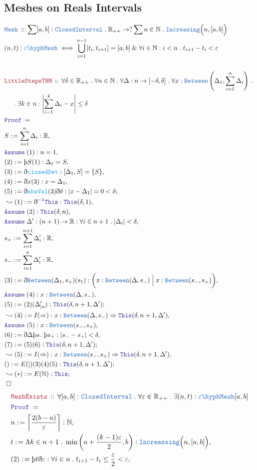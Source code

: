 \documentclass[12pt]{scrartcl}
\newcommand{\TYPE}[1]{\textcolor{NavyBlue}{\mathtt{#1}}}
\newcommand{\FUNC}[1]{\textcolor{Cerulean}{\mathtt{#1}}}
\newcommand{\LOGIC}[1]{\textcolor{Blue}{\mathtt{#1}}}
\newcommand{\THM}[1]{\textcolor{Maroon}{\mathtt{#1}}}
\renewcommand{\.}{\; . \;}
\newcommand{\de}{: \kern 0.1pc =}
\newcommand{\Theorem}[2]{& \THM{#1} \, :: \, #2 \\ & \Proof = \\ }
\newcommand{\DeclareType}[2]{& \TYPE{#1} \, :: \, #2 \\}
\newcommand{\DefineType}[3]{& #1 : \TYPE{#2} \iff #3 \\}
\newcommand{\NewLine}{\\ & \kern 1pc}
\newcommand{\Page}[1]{ \begin{align*} #1 \end{align*}   }
\newcommand{ \bd }{ \ByDef }
\renewcommand{\And}{\; \& \;}
\newcommand{\Reals}{\mathbb{R} }
\newcommand{\Nat}{\mathbb{N} }
\newcommand{\Say}[3]{& #1 \de #2 : #3, \\}
\newcommand{\Conclude}[3]{& #1 \de #2 : #3; \\}
\newcommand{\Derive}[3]{& \leadsto #1 \de #2 : #3, \\}
\newcommand{\DeriveConclude}[3]{& \leadsto #1 \de #2 : #3 ; \\}
\newcommand{\Assume}[2]{& \LOGIC{Assume} \;#1 : #2, \\}
\newcommand{\QED}{\; \square}
\newcommand{\EndProof}{& \QED \\}
\newcommand{\ByDef}{\eth}
\newcommand{\ByConstr}{\text{\thorn}}
\newcommand{\Proof}{\LOGIC{Proof} \; }
\begin{document}
\subsection{Meshes on Reals Intervals}
\Page{
	\DeclareType{Mesh}{\sum [a,b] : \TYPE{ClosedInterval} \. \Reals_{++} \to      
	 ? \sum n \in \Nat \. \TYPE{Increasing}\Big(n, [a,b] \Big) 
	}
	\DefineType{(n,t)}{\varepsilon \hyph Mesh}{ \bigcup^{n-1}_{i=1} [t_i,t_{i+1}]  = [a,b] 
		\And \forall i \in \Nat : i < n \.  t_{i+1} - t_i < \varepsilon  }
	\\
	\Theorem{LittleStepsTHM}{\forall \delta \in \Reals_{++} \. \forall n \in \Nat \. 
		\forall \Delta : n \to [-\delta,\delta] \. \forall x : \TYPE{Between}\left(\Delta_1,
		\sum^n_{i=1} \Delta_i \right) \. 
		\NewLine \.
		\exists k \in n : 
		\left| \sum^k_{i=1} \Delta_i - x \right| \le \delta
	}
	\Say{S}{\sum^n_{i=1} \Delta_i}{\Reals}
        \Assume{(1)}{n=1}
	\Say{(2)}{\ByConstr S(1)}{\Delta_1 = S  }
	\Say{(3)}{ \bd \FUNC{closedSet}  }{ [\Delta_1,S] = \{ S \} }
	\Say{(4)}{\bd x (3)}{x = \Delta_1}
	\Conclude{(5)}{\bd \FUNC{absVal}(3)\bd \delta}{|x - \Delta_1| = 0 < \delta}
	\Derive{(1)}{\bd^{-1} \LOGIC{This}}{\LOGIC{This}(\delta, 1 )}
	\Assume{(2)}{\LOGIC{This}(\delta,n)}
	\Assume{\Delta'}{(n+1) \to \Reals : \forall i \in n + 1 \. |\Delta_i|< \delta}
	\Say{s_+}{\sum^{n+1}_{i=1} \Delta'_i}{\Reals}
	\Say{s_-}{\sum^{n}_{i=1} \Delta'_i}{\Reals}
	\Say{(3)}{\bd \TYPE{Between}(\Delta_1,s_+)(s_1)}{ \bigg( x : \TYPE{Between}(\Delta,s_-) \; \Big| \; 
		x : \TYPE{Between}(s_-,s_+) \bigg) } 
	\Assume{(4)}{ x : \TYPE{Between}(\Delta, s_-)  }
	\Conclude{(5)}{(2)(\Delta'_{|n})}{ \LOGIC{This}(\delta,n+1,\Delta')}
	\Derive{(4)}{I(\Rightarrow)}{ x : \TYPE{Between}(\Delta,s_-) \Rightarrow \LOGIC{This}(\delta,n+1,\Delta') }
	\Assume{(5)}{x : \TYPE{Between}(s_-,s_+)}
	\Say{(6)}{\bd \Delta \ByConstr s_- \ByConstr s_+}{|s_- - s_+| < \delta}
	\Conclude{(7)}{(5)(6)}{\LOGIC{This}(\delta,n+1,\Delta')}
	\Derive{(5)}{I(\Rightarrow)}{x : \TYPE{Between}(s_-,s_+) \Rightarrow \LOGIC{This}(\delta,n+1,\Delta')}
	\Conclude{()}{E(|)(3)(4)(5)}{\LOGIC{This}(\delta,n+1,\Delta')}
	\DeriveConclude{(*)}{E(\Nat)}{\LOGIC{This}}
	\EndProof
}\Page{
	\Theorem{MeshExists}{\forall [a,b] : \TYPE{ClosedInterval} \. \forall \varepsilon \in \Reals_{++} \.
	   \exists (n,t) : \TYPE{\varepsilon\hyph Mesh}[a,b]                              
	}
	\Say{n }{\left \lceil \frac{2(b - a)}{\varepsilon} \right \rceil}{\Nat}
	\Say{t}{\Lambda k \in n + 1  \. \min\left(  a + \frac{(k - 1)\varepsilon}{2} , b \right) }
	{ \TYPE{Increassing}\Big(n, [a,b]\Big)}
	\Say{(2)}{\ByConstr t \bd \varepsilon}{\forall i \in n \. t_{i+1} - t_i \le \frac{\varepsilon}{2} < \varepsilon}
}
\end{document}
